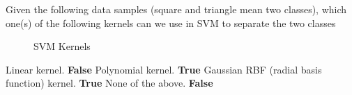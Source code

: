 \documentclass[12pt]{exam}
\begin{document}
\begin{questions}
{%
\renewcommand*\thechoice{\arabic{choice}} 
\renewcommand*\choicelabel{\thechoice)}
%
\question[1] Given the following data samples (square and triangle mean two classes), which one(s) of the following kernels can we use in SVM to separate the two classes \\
\begin{figure}[h]
\centering
{}
\caption{SVM Kernels}
\end{figure}
\begin{multicols}{2}
\begin{choices}
\choice Linear kernel. \textbf{False}
\choice Polynomial kernel. \textbf{True}
\choice Gaussian RBF (radial basis function) kernel. \textbf{True}
\choice None of the above. \textbf{False}
\end{choices}
\end{multicols}
}%


\end{questions}
\end{document}
